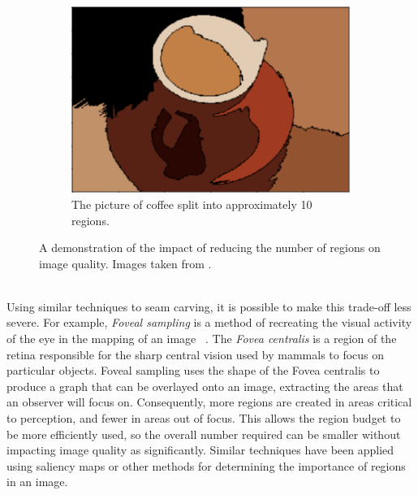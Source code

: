 \begin{figure}[htp]
\begin{subfigure}[t]{0.29\textwidth}
        \includegraphics[scale=0.34]{figures/adjacencyAfter}
        \caption{The picture of coffee split into approximately 10 regions.}
    \end{subfigure}%
    \caption[Tuning Region Adjacency Graphs]{A demonstration of the impact of reducing the number of regions on image quality. Images taken from \cite{Foveal}.}
    \label{fig:regions}
\end{figure}
\smallskip \\ \indent
Using similar techniques to seam carving, it is possible to make this trade-off less severe. For example, \textit{Foveal sampling} is a method of recreating the visual activity of the eye in the mapping of an image ~\cite{Foveal}. The \textit{Fovea centralis} is a region of the retina responsible for the sharp central vision used by mammals to focus on particular objects. Foveal sampling uses the shape of the Fovea centralis to produce a graph that can be overlayed onto an image, extracting the areas that an observer will focus on. Consequently, more regions are created in areas critical to perception, and fewer in areas out of focus. This allows the region budget to be more efficiently used, so the overall number required can be smaller without impacting image quality as significantly. Similar techniques have been applied using saliency maps or other methods for determining the importance of regions in an image.
